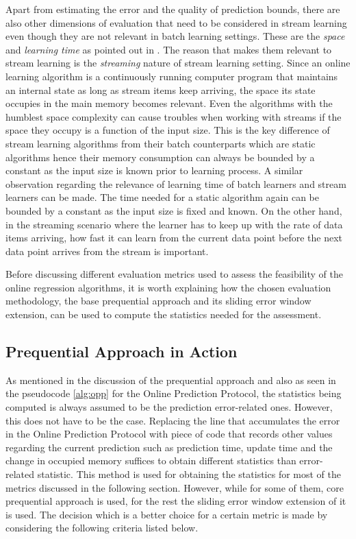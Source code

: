 Apart from estimating the error and the quality of prediction bounds, there are also other dimensions of evaluation that need to be considered in stream learning even though they are not relevant in batch learning settings. These are the \textit{space} and \textit{learning time} as pointed out in \citep[p. 320]{gama_evaluating_2013}. The reason that makes them relevant to stream learning is the \textit{streaming} nature of stream learning setting. Since an online learning algorithm is a continuously running computer program that maintains an internal state as long as stream items keep arriving, the space its state occupies in the main memory becomes relevant. Even the algorithms with the humblest space complexity can cause troubles when working with streams if the space they occupy is a function of the input size. This is the key difference of stream learning algorithms from their batch counterparts which are static algorithms hence their memory consumption can always be bounded by a constant as the input size is known prior to learning process. A similar observation regarding the relevance of learning time of batch learners and stream learners can be made. The time needed for a static algorithm again can be bounded by a constant as the input size is fixed and known. On the other hand, in the streaming scenario where the learner has to keep up with the rate of data items arriving, how fast it can learn from the current data point before the next data point arrives from the stream is important.

Before discussing different evaluation metrics used to assess the feasibility of the online regression algorithms, it is worth explaining how the chosen evaluation methodology, the base prequential approach and its sliding error window extension, can be used to compute the statistics needed for the assessment.

\subsection{Prequential Approach in Action}
As mentioned in the discussion of the prequential approach and also as seen in the pseudocode \ref{alg:opp} for the Online Prediction Protocol, the statistics being computed is always assumed to be the prediction error-related ones. However, this does not have to be the case. Replacing the line that accumulates the error in the Online Prediction Protocol with piece of code that records other values regarding the current prediction such as prediction time, update time and the change in occupied memory suffices to obtain different statistics than error-related statistic. This method is used for obtaining the statistics for most of the metrics discussed in the following section. However, while for some of them, core prequential approach is used, for the rest the sliding error window extension of it is used. The decision which is a better choice for a certain metric is made by considering the following criteria listed below.

